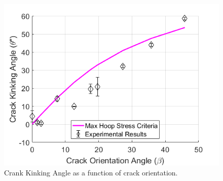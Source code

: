 \documentclass[12pt]{article}
\begin{document}
\begin{figure}[H]
	\centering
	\includegraphics[width=.67\textwidth,scale=1]{Goal3.png}
	\caption{Crank Kinking Angle as a function of crack orientation.}
	\label{fig:Goal3}
\end{figure}




\end{document}

